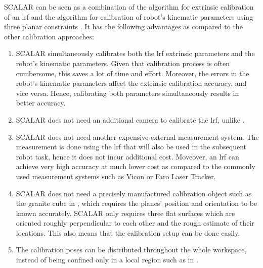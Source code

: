 SCALAR can be seen as a combination of the algorithm for extrinsic calibration of an \ac{lrf} \cite{Zhang2004} and the algorithm for calibration of robot's kinematic parameters using three planar constraints \cite{Joubair2015}. It has the following advantages as compared to the other calibration approaches:
\begin{enumerate}
\item SCALAR simultaneously calibrates both the \ac{lrf} extrinsic parameters and the robot's kinematic parameters. Given that calibration process is often cumbersome, this saves a lot of time and effort. Moreover, the errors in the robot's kinematic parameters affect the extrinsic calibration accuracy, and vice versa. Hence, calibrating both parameters simultaneously results in better accuracy. 
\item SCALAR does not need an additional camera to calibrate the \ac{lrf}, unlike \cite{Zhang2004}.
\item SCALAR does not need another expensive external measurement system. The measurement is done using the \ac{lrf} that will also be used in the subsequent robot task, hence it does not incur additional cost. Moveover, an \ac{lrf} can achieve very high accuracy at much lower cost as compared to the commonly used measurement systems such as Vicon or Faro Laser Tracker. 
\item SCALAR does not need a precisely manufactured calibration object such as the granite cube in \cite{Joubair2015}, which requires the planes' position and orientation to be known accurately. SCALAR only requires
three flat surfaces which are oriented roughly perpendicular to each other and the rough estimate of their locations. This also means that the calibration setup can be done easily.
\item The calibration poses can be distributed throughout the whole workspace, instead of being confined only in a local region such as in \cite{Joubair2015}. 
\end{enumerate}



